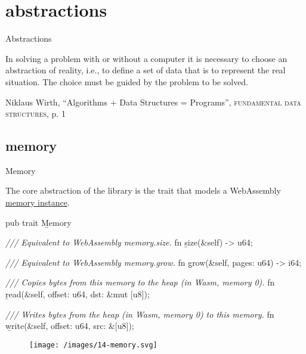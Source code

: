 \documentclass{article}
\begin{document}
\section{abstractions}{Abstractions}
\epigraph{
  In solving a problem with or without a computer it is necessary to choose an abstraction of reality, i.e., to define a set of data that is to represent the real situation.
  The choice must be guided by the problem to be solved.
}{Niklaus Wirth, ``Algorithms + Data Structures = Programs'', \textsc{fundamental data structures}, p. 1}

\subsection{memory}{Memory}

The core abstraction of the library is the \href{https://docs.rs/ic-stable-structures/latest/ic_stable_structures/trait.Memory.html}{} trait that models a WebAssembly \href{https://webassembly.github.io/multi-memory/core/exec/runtime.html#memory-instances}{memory instance}.

\begin{code}[rust]
pub trait \b{Memory} {
    \emph{/// Equivalent to WebAssembly memory.size.}
    fn \b{size}(&self) -> u64;

    \emph{/// Equivalent to WebAssembly memory.grow.}
    fn \b{grow}(&self, pages: u64) -> i64;

    \emph{/// Copies bytes from this memory to the heap (in Wasm, memory 0).}
    fn \b{read}(&self, offset: u64, dst: &mut [u8]);

    \emph{/// Writes bytes from the heap (in Wasm, memory 0) to this memory.}
    fn \b{write}(&self, offset: u64, src: &[u8]);
}
\end{code}

\begin{figure}[grayscale-diagram]
\texttt{[image: /images/14-memory.svg]}
\end{figure}
\end{document}
